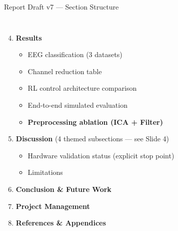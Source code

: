 \documentclass[aspectratio=169, 11pt]{beamer}
\begin{document}
\begin{frame}{Report Draft v7 --- Section Structure}
\begin{columns}[T]
        \begin{enumerate}
            \setcounter{enumi}{3}
            \item \textbf{Results}
            \begin{itemize}
                \item EEG classification (3 datasets)
                \item Channel reduction table
                \item RL control architecture comparison
                \item End-to-end simulated evaluation
                \item \textbf{Preprocessing ablation (ICA + Filter)}
            \end{itemize}
            \item \textbf{Discussion} (4 themed subsections --- see Slide 4)
            \begin{itemize}
                \item Hardware validation status (explicit stop point)
                \item Limitations
            \end{itemize}
            \item \textbf{Conclusion \& Future Work}
            \item \textbf{Project Management}
            \item \textbf{References \& Appendices}
        \end{enumerate}
    \end{columns}
\end{frame}
\end{document}
